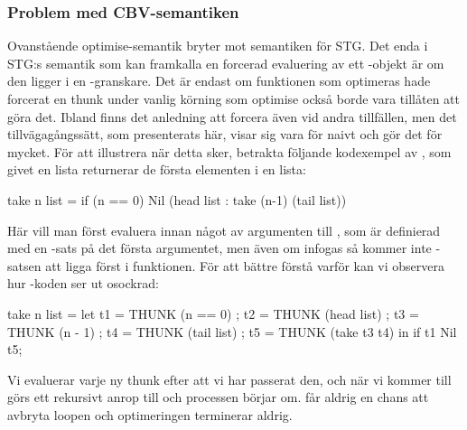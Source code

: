 \documentclass[../Optimise]{subfiles}
\begin{document}

\subsubsection{Problem med CBV-semantiken}
\label{CBV:Problem}

Ovanstående optimise-semantik bryter mot semantiken för STG. 
Det enda i STG:s semantik som kan framkalla en forcerad evaluering av ett
-objekt är om den ligger i en -granskare. 
Det är endast om funktionen som optimeras hade forcerat en thunk under vanlig 
körning som optimise också borde vara tillåten att göra det. Ibland finns 
det anledning  att forcera även vid andra tillfällen, men det tillvägagångssätt,
som presenterats här, visar sig vara för naivt och gör det för mycket. För
att illustrera när detta sker, betrakta följande kodexempel av ,
som givet en lista returnerar de första  elementen i en lista:

\begin{codeEx}
take n list = if (n == 0) Nil (head list : take (n-1) (tail list))
\end{codeEx}
Här vill man först evaluera  innan något av argumenten till , 
som är definierad med en -sats på det första argumentet, men även om
 infogas så kommer inte -satsen att ligga först i funktionen. För att bättre 
förstå varför kan vi observera hur -koden ser ut osockrad:

\begin{codeEx}
take n list = let 
    { t1 = THUNK (n == 0)
    ; t2 = THUNK (head list)
    ; t3 = THUNK (n - 1)
    ; t4 = THUNK (tail list)
    ; t5 = THUNK (take t3 t4)
    } in  if t1 Nil t5;
\end{codeEx}

Vi evaluerar varje ny thunk efter att vi har passerat den, och när vi kommer till 
 görs ett rekursivt anrop till  och processen börjar om.
 får aldrig en chans att avbryta loopen och optimeringen terminerar aldrig.
\end{document}
